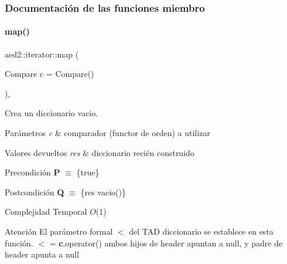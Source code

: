\subsubsection{Documentación de las funciones miembro}
\mbox{\label{classaed2_1_1iterator_ab55f7bc4639e905d66935b56995a5b1f_ab55f7bc4639e905d66935b56995a5b1f}} 
\paragraph{\texorpdfstring{map()}{map()}\hspace{0.1cm}{\footnotesize\ttfamily [1/3]}}
{\footnotesize\ttfamily aed2\+::iterator\+::map (\begin{DoxyParamCaption}\item[{Compare}]{c = {\ttfamily Compare()} }\end{DoxyParamCaption})\hspace{0.3cm}{\ttfamily [inline]}, {\ttfamily [explicit]}}



Crea un diccionario vacio. 


\begin{DoxyParams}{Parámetros}
{\em c} & comparador (functor de orden) a utilizar \\
\hline
\end{DoxyParams}

\begin{DoxyRetVals}{Valores devueltos}
{\em res} & diccionario recién construido\\
\hline
\end{DoxyRetVals}
\begin{DoxyPrecond}{Precondición}
{\bfseries P} $\equiv$ \{true\} 
\end{DoxyPrecond}
\begin{DoxyPostcond}{Postcondición}
{\bfseries Q} $\equiv$ \{res  vacio()\}
\end{DoxyPostcond}

\begin{DoxyDescription}
\item[Complejidad Temporal]$O$(1)
\end{DoxyDescription}

\begin{DoxyAttention}{Atención}
El parámetro formal $<$ del T\+AD diccionario se establece en esta función. $<$ = {\bfseries c}.operator() ambos hijos de header apuntan a null, y padre de header apunta a null 
\end{DoxyAttention}


